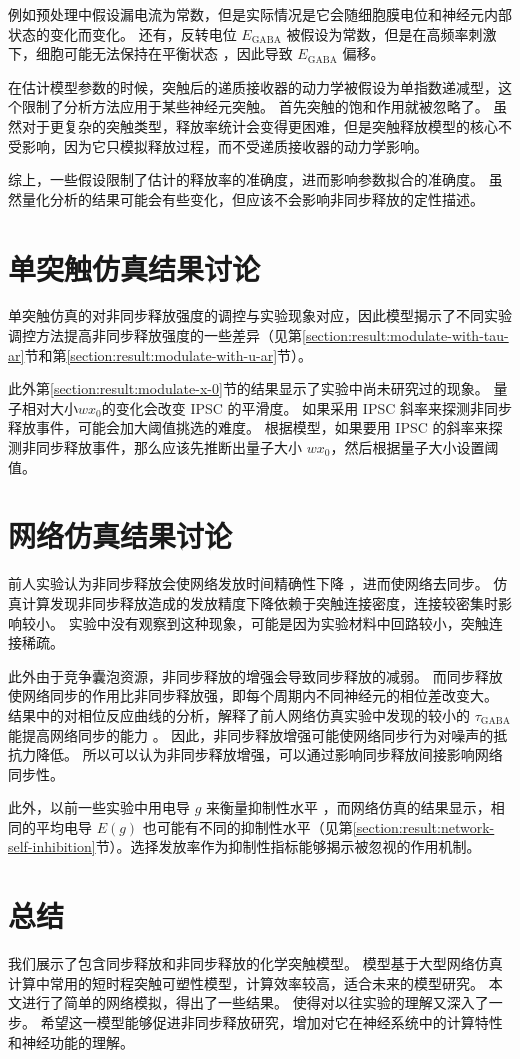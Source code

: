 例如预处理中假设漏电流为常数，但是实际情况是它会随细胞膜电位和神经元内部状态的变化而变化。
还有，反转电位 $E_\text{GABA}$ 被假设为常数，但是在高频率刺激下，细胞可能无法保持在平衡状态 \cite{Staley1995}，因此导致 $E_\text{GABA}$ 偏移。

在估计模型参数的时候，突触后的递质接收器的动力学被假设为单指数递减型，这个限制了分析方法应用于某些神经元突触。
首先突触的饱和作用就被忽略了。
虽然对于更复杂的突触类型，释放率统计会变得更困难，但是突触释放模型的核心不受影响，因为它只模拟释放过程，而不受递质接收器的动力学影响。

综上，一些假设限制了估计的释放率的准确度，进而影响参数拟合的准确度。
虽然量化分析的结果可能会有些变化，但应该不会影响非同步释放的定性描述。

\section{单突触仿真结果讨论}
\label{section:discussion:synapse-simulation}
单突触仿真的对非同步释放强度的调控与实验现象对应，因此模型揭示了不同实验调控方法提高非同步释放强度的一些差异（见第\ref{section:result:modulate-with-tau-ar}节和第\ref{section:result:modulate-with-u-ar}节）。

此外第\ref{section:result:modulate-x-0}节的结果显示了实验中尚未研究过的现象。
量子相对大小$wx_0$的变化会改变 IPSC 的平滑度。
如果采用 IPSC 斜率来探测非同步释放事件，可能会加大阈值挑选的难度。
根据模型，如果要用 IPSC 的斜率来探测非同步释放事件，那么应该先推断出量子大小 $wx_0$，然后根据量子大小设置阈值。

\section{网络仿真结果讨论}
\label{section:discussion:network-simulation}
前人实验认为非同步释放会使网络发放时间精确性下降 \cite{Manseau2010}，进而使网络去同步。
仿真计算发现非同步释放造成的发放精度下降依赖于突触连接密度，连接较密集时影响较小。
实验中没有观察到这种现象，可能是因为实验材料中回路较小，突触连接稀疏。

此外由于竞争囊泡资源，非同步释放的增强会导致同步释放的减弱。
而同步释放使网络同步的作用比非同步释放强，即每个周期内不同神经元的相位差改变大。
结果中的对相位反应曲线的分析，解释了前人网络仿真实验中发现的较小的 $\tau_\text{GABA}$ 能提高网络同步的能力 \cite{Bartos2002}。
因此，非同步释放增强可能使网络同步行为对噪声的抵抗力降低。
所以可以认为非同步释放增强，可以通过影响同步释放间接影响网络同步性。

此外，以前一些实验中用电导 $g$ 来衡量抑制性水平 \cite{Wang1996,Voegtlin2007}，而网络仿真的结果显示，相同的平均电导 $E(g)$ 也可能有不同的抑制性水平（见第\ref{section:result:network-self-inhibition}节）。选择发放率作为抑制性指标能够揭示被忽视的作用机制。

\section{总结}
我们展示了包含同步释放和非同步释放的化学突触模型。
模型基于大型网络仿真计算中常用的短时程突触可塑性模型，计算效率较高，适合未来的模型研究。
本文进行了简单的网络模拟，得出了一些结果。
使得对以往实验的理解又深入了一步。
希望这一模型能够促进非同步释放研究，增加对它在神经系统中的计算特性和神经功能的理解。
